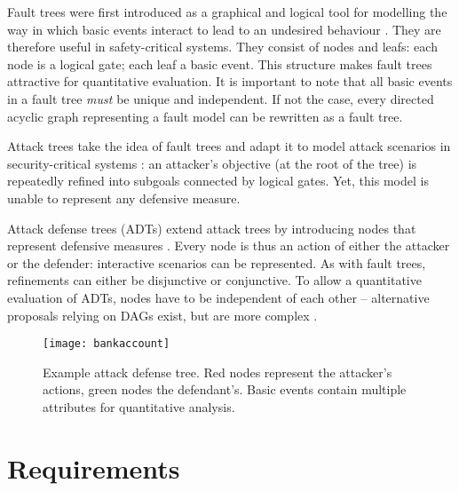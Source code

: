 \documentclass{scrreprt}
\begin{document}
Fault trees were first introduced as a graphical and logical tool for modelling
the way in which basic events interact to lead to an undesired behaviour
\cite[IV.1]{Vesely1981}. They are therefore useful in safety-critical systems.
They consist of nodes and leafs: each node is a logical gate; each leaf a basic
event. This structure makes fault trees attractive for quantitative evaluation.
It is important to note that all basic events in a fault tree \textit{must} be
unique and independent. If not the case, every directed acyclic graph
representing a fault model can be rewritten as a fault tree.  

Attack trees take the idea of fault trees and adapt it to model attack scenarios
in security-critical systems \cite{Schneier1999} \cite{Brooke2003}
\cite{NaiFovino2009}: an attacker's objective (at the root of the tree) is
repeatedly refined into subgoals connected by logical gates. Yet, this model is
unable to represent any defensive measure.

Attack defense trees (ADTs) extend attack trees by introducing nodes that
represent defensive measures \cite{Kordy}. Every node is thus an action of
either the attacker or the defender: interactive scenarios can be represented.
As with fault trees, refinements can either be disjunctive or conjunctive. To
allow a quantitative evaluation of ADTs, nodes have to be independent of each
other -- alternative proposals relying on DAGs exist, but are more complex
\cite{Kordy2013a}.

\begin{figure}[h]
    \label{example-adt}
    \centering
    \texttt{[image: bankaccount]}
    \caption{Example attack defense tree. Red nodes represent the attacker's
    actions, green nodes the defendant's. Basic events contain multiple
    attributes for quantitative analysis.}
\end{figure}



\section{Requirements}


\cite{Kordy2012}

\end{document}
